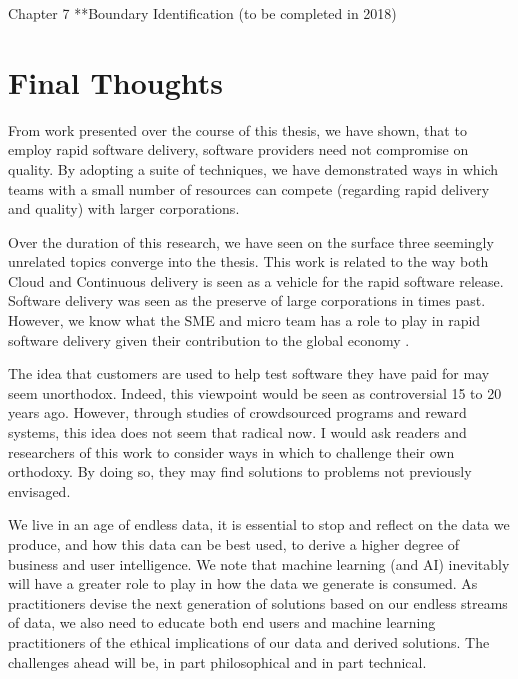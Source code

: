 Chapter 7  **Boundary Identification (to be completed in 2018)

\section{Final Thoughts}

From work presented over the course of this thesis, we have shown, that to employ rapid software delivery, software providers need not compromise on quality. By adopting a suite of techniques, we have demonstrated ways in which teams with a small number of resources can compete (regarding rapid delivery and quality) with larger corporations. 

Over the duration of this research, we have seen on the surface three seemingly unrelated topics converge into the thesis. This work is related to the way both Cloud and Continuous delivery is seen as a vehicle for the rapid software release. Software delivery was seen as the preserve of large corporations in times past. However, we know what the SME and micro team has a role to play in rapid software delivery given their contribution to the global economy \cite{WTO}.

The idea that customers are used to help test software they have paid for may seem unorthodox. Indeed, this viewpoint would be seen as controversial 15 to 20 years ago. However, through studies of crowdsourced programs and reward systems, this idea does not seem that radical now. I would ask readers and researchers of this work to consider ways in which to challenge their own orthodoxy. By doing so, they may find solutions to problems not previously envisaged.

We live in an age of endless data, it is essential to stop and reflect on the data we produce, and how this data can be best used, to derive a higher degree of business and user intelligence. We note that machine learning (and AI) inevitably will have a greater role to play in how the data we generate is consumed. As practitioners devise the next generation of solutions based on our endless streams of data, we also need to educate both end users and machine learning practitioners of the ethical implications of our data and derived solutions. The challenges ahead will be, in part philosophical and in part technical. 

